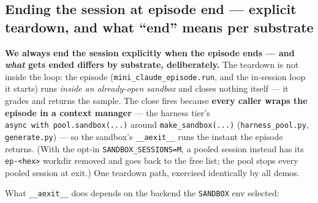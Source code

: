 \documentclass[
  paper=a4,
  ,captions=tableheading
]{scrartcl}
\begin{document}
\hypertarget{ending-the-session-at-episode-end-explicit-teardown-and-what-end-means-per-substrate}{%
\subsection{Ending the session at episode end --- explicit teardown, and
what ``end'' means per
substrate}\label{ending-the-session-at-episode-end-explicit-teardown-and-what-end-means-per-substrate}}

\textbf{We always end the session explicitly when the episode ends ---
and \emph{what} gets ended differs by substrate, deliberately.} The
teardown is not inside the loop: the episode
(\texttt{mini\_claude\_episode.run}, and the in-session loop it starts)
runs \emph{inside an already-open sandbox} and closes nothing itself ---
it grades and returns the sample. The close fires because \textbf{every
caller wraps the episode in a context manager} --- the harness tier's
\texttt{async\ with\ pool.sandbox(...)} around
\texttt{make\_sandbox(...)} (\texttt{harness\_pool.py},
\texttt{generate.py}) --- so the sandbox's \texttt{\_\_aexit\_\_} runs
the instant the episode returns. (With the opt-in
\texttt{SANDBOX\_SESSIONS=M}, a pooled session instead has its
\texttt{ep-\textless{}hex\textgreater{}} workdir removed and goes back
to the free list; the pool stops every pooled session at exit.) One
teardown path, exercised identically by all demos.

What \texttt{\_\_aexit\_\_} does depends on the backend the
\texttt{SANDBOX} env selected:
\end{document}
